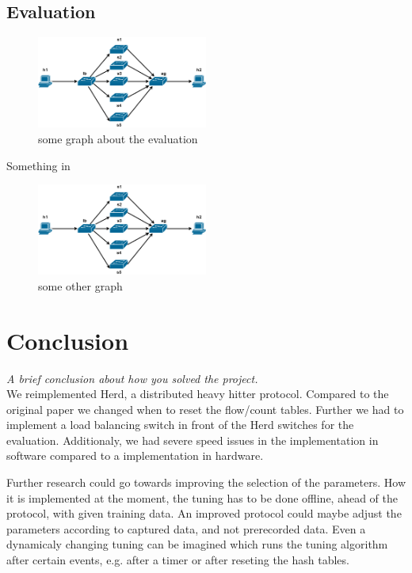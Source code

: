 \documentclass[11pt,oneside,a4paper]{article}
\newcommand{\hint}[1]{{\color{blue} \em #1}}
\begin{document}
\subsection{Evaluation} \label{evaluation}
\begin{figure}
	\centering
	\includegraphics[width=0.5\textwidth]{figures/Herd_topology}
	\caption{some graph about the evaluation}
	\label{fig:topology_fig}
\end{figure}

\lipsum[1]
Something in %

\begin{figure}
	\centering
	\includegraphics[width=0.5\textwidth]{figures/Herd_topology}
	\caption{some other graph}
	\label{fig:topology_fig}
\end{figure}

\section{Conclusion}
\hint{A brief conclusion about how you solved the project.} \\
We reimplemented Herd, a distributed heavy hitter protocol. Compared to the original paper we changed when to reset the flow/count tables. Further we had to implement a load balancing switch in front of the Herd switches for the evaluation. Additionaly, we had severe speed issues in the implementation in software compared to a implementation in hardware.

Further research could go towards improving the selection of the parameters. How it is implemented at the moment, the tuning has to be done offline, ahead of the protocol, with given training data. An improved protocol could maybe adjust the parameters according to captured data, and not prerecorded data. Even a dynamicaly changing tuning can be imagined which runs the tuning algorithm after certain events, e.g. after a timer or after reseting the hash tables. 
\end{document}
